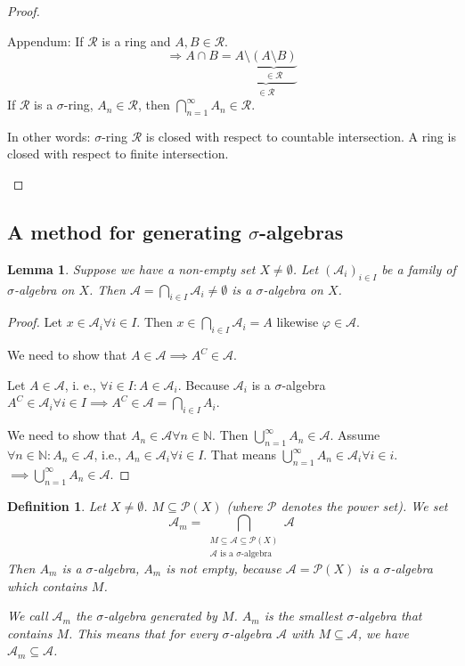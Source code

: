 \documentclass{article}
\newtheorem{definition}{Definition}  \numberwithin{definition}{section}
\newtheorem{lemma}{Lemma}  \numberwithin{lemma}{section}
\begin{document}
\begin{proof}
\begin{enumerate}
      Appendum: If $\mathcal R$ is a ring and $A, B \in \mathcal R$.
      \[ \Rightarrow A \cap B = \underbrace{A \setminus \underbrace{(A \setminus B)}_{\in \mathcal R}}_{\in \mathcal R} \]
      If $\mathcal R$ is a $\sigma$-ring, $A_n \in \mathcal R$, then $\bigcap_{n=1}^\infty A_n \in \mathcal R$.

      In other words:
      $\sigma$-ring $\mathcal R$ is closed with respect to countable intersection.
      A ring is closed with respect to finite intersection.
  \end{enumerate}
\end{proof}

\subsection{A method for generating $\sigma$-algebras}

\begin{lemma}
  \label{l:ten}
  Suppose we have a non-empty set $X \neq \emptyset$. Let $(\mathcal A_i)_{i \in I}$ be a family of $\sigma$-algebra on $X$.
  Then $\mathcal A = \bigcap_{i \in I} \mathcal A_i \neq \emptyset$ is a $\sigma$-algebra on $X$.
\end{lemma}

\begin{proof}
  Let $x \in \mathcal A_i \forall i \in I$. Then $x \in \bigcap_{i \in I} \mathcal A_i = A$ likewise $\varphi \in \mathcal A$.

  We need to show that $A \in \mathcal A \implies A^C \in \mathcal A$.

  Let $A \in \mathcal A$, i. e., $\forall i \in I: A \in \mathcal A_i$.
  Because $\mathcal A_i$ is a $\sigma$-algebra $A^C \in \mathcal A_i \forall i \in I \implies A^C \in \mathcal A = \bigcap_{i \in I} A_i$.

  We need to show that $A_n \in \mathcal A \forall n \in \mathbb N$. Then $\bigcup_{n=1}^\infty A_n \in \mathcal A$.
  Assume $\forall n \in \mathbb N: A_n \in \mathcal A$, i.e., $A_n \in \mathcal A_i \forall i \in I$.
  That means $\bigcup_{n=1}^\infty A_n \in \mathcal A_i \forall i \in i$. $\implies \bigcup_{n=1}^\infty A_n \in \mathcal A$.
\end{proof}

\begin{definition}
  Let $X \neq \emptyset$. $M \subseteq \mathcal P(X)$ (where $\mathcal P$ denotes the power set).
  We set
  \[ \mathcal A_m = \bigcap_{\substack{M \subseteq \mathcal A \subseteq \mathcal P(X) \\ \mathcal{A} \text{ is a } \sigma\text{-algebra}}} \mathcal A \]
  Then $A_m$ is a $\sigma$-algebra, $A_m$ is not empty, because $\mathcal A = \mathcal P(X)$ is a $\sigma$-algebra which contains $M$.

  We call $\mathcal A_m$ the $\sigma$-algebra generated by $M$.
  $A_m$ is the smallest $\sigma$-algebra that contains $M$. This means that for every $\sigma$-algebra $\mathcal A$ with $M \subseteq \mathcal A$, we have $\mathcal A_m \subseteq \mathcal A$.
\end{definition}
\end{document}
